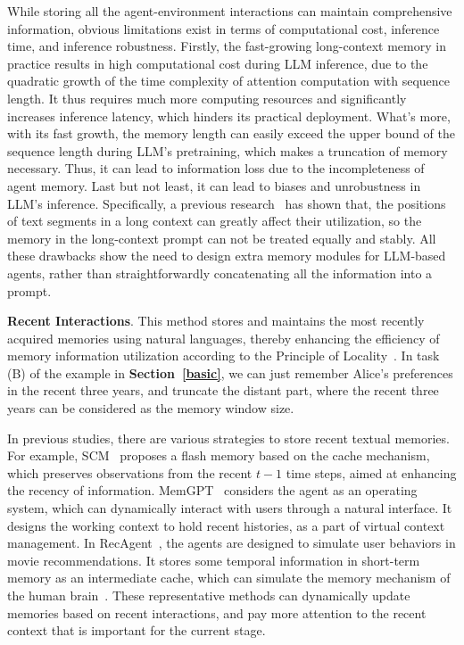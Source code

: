 \documentclass{article}
\theoremstyle{definition}
\theoremstyle{theorem}
\theoremstyle{proof}
\theoremstyle{remark}
\begin{document}
	While storing all the agent-environment interactions can maintain comprehensive information, obvious limitations exist in terms of computational cost, inference time, and inference robustness.
	Firstly, the fast-growing long-context memory in practice results in high computational cost during LLM inference, due to the quadratic growth of the time complexity of attention computation with sequence length.
	It thus requires much more computing resources and significantly increases inference latency, which hinders its practical deployment.
	What's more, with its fast growth, the memory length can easily exceed the upper bound of the sequence length during LLM's pretraining, which makes a truncation of memory necessary. Thus, it can lead to information loss due to the incompleteness of agent memory.
	Last but not least, it can lead to biases and unrobustness in LLM's inference.
	Specifically, a previous research~\cite{lost_in_the_middle} has shown that, the positions of text segments in a long context can greatly affect their utilization, so the memory in the long-context prompt can not be treated equally and stably. 
	All these drawbacks show the need to design extra memory modules for LLM-based agents, rather than straightforwardly concatenating all the information into a prompt.
	
	\textbf{Recent Interactions}.
	This method stores and maintains the most recently acquired memories using natural languages, thereby enhancing the efficiency of memory information utilization according to the Principle of Locality~\cite{principle_of_locality}.
	In task (B) of the example in \textbf{Section~\ref{basic}}, we can just remember Alice's preferences in the recent three years, and truncate the distant part, where the recent three years can be considered as the memory window size.
	
	In previous studies, there are various strategies to store recent textual memories.
	For example, SCM~\cite{scm} proposes a flash memory based on the cache mechanism, which preserves observations from the recent $t-1$ time steps, aimed at enhancing the recency of information.
	MemGPT~\cite{memgpt} considers the agent as an operating system, which can dynamically interact with users through a natural interface. It designs the working context to hold recent histories, as a part of virtual context management.
	In RecAgent~\cite{recagent}, the agents are designed to simulate user behaviors in movie recommendations. It stores some temporal information in short-term memory as an intermediate cache, which can simulate the memory mechanism of the human brain~\cite{ebbinghaus1885memory,murre2015replication}.
	These representative methods can dynamically update memories based on recent interactions, and pay more attention to the recent context that is important for the current stage.
	
\end{document}
